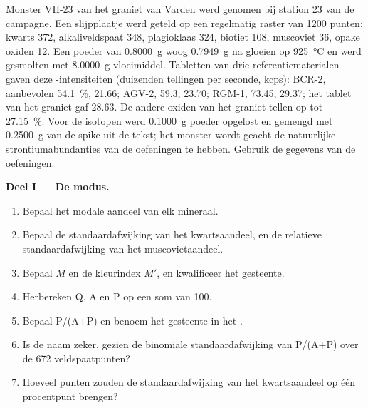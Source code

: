 \begin{problem}\label{pb:b2:field-lab-methods-2:1}
Monster VH-23 van het graniet van Varden werd genomen bij station 23 van de campagne. Een slijpplaatje werd
geteld op een regelmatig raster van 1200 punten: kwarts 372, alkaliveldspaat 348, plagioklaas 324,
biotiet 108, muscoviet 36, opake oxiden 12. Een poeder van \qty{0.8000}{g} woog \qty{0.7949}{g}
na gloeien op \qty{925}{\celsius} en werd gesmolten met \qty{8.0000}{g} vloeimiddel. Tabletten van drie
referentiematerialen gaven deze -intensiteiten (duizenden tellingen per seconde, kcps): BCR-2,
aanbevolen \qty{54.1}{\percent}, 21.66; AGV-2, 59.3, 23.70; RGM-1, 73.45, 29.37; het tablet van het graniet
gaf 28.63. De andere oxiden van het graniet tellen op tot \qty{27.15}{\percent}. Voor de isotopen werd
\qty{0.1000}{g} poeder opgelost en gemengd met \qty{0.2500}{g} van de spike uit de tekst;
het monster wordt geacht de natuurlijke strontiumabundanties van de oefeningen te hebben. Gebruik de gegevens van de
oefeningen.

\noindent\textbf{Deel I --- De modus.}
\begin{enumerate}
  \item Bepaal het modale aandeel van elk mineraal.
  \item Bepaal de standaardafwijking van het kwartsaandeel, en de relatieve standaardafwijking
        van het muscovietaandeel.
  \item Bepaal $M$ en de kleurindex $M'$, en kwalificeer het gesteente.
  \item Herbereken Q, A en P op een som van 100.
  \item Bepaal P/(A+P) en benoem het gesteente in het .
  \item Is de naam zeker, gezien de binomiale standaardafwijking van P/(A+P) over de 672
        veldspaatpunten?
  \item Hoeveel punten zouden de standaardafwijking van het kwartsaandeel op één procentpunt
        brengen?
\end{enumerate}


\end{problem}
